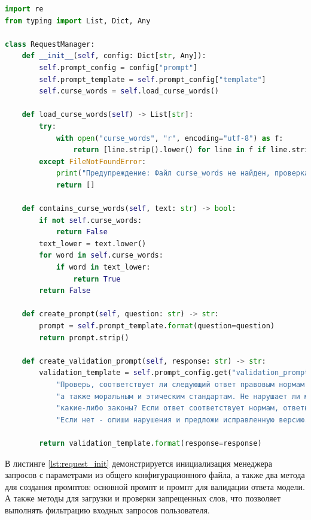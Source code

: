 \begin{lstlisting}[caption={Инициализация менеджера запросов}, label=lst:request_init, language=Python]
import re
from typing import List, Dict, Any

class RequestManager:
    def __init__(self, config: Dict[str, Any]):
        self.prompt_config = config["prompt"]
        self.prompt_template = self.prompt_config["template"]
        self.curse_words = self.load_curse_words()

    def load_curse_words(self) -> List[str]:
        try:
            with open("curse_words", "r", encoding="utf-8") as f:
                return [line.strip().lower() for line in f if line.strip()]
        except FileNotFoundError:
            print("Предупреждение: Файл curse_words не найден, проверка будет пропущена")
            return []

    def contains_curse_words(self, text: str) -> bool:
        if not self.curse_words:
            return False
        text_lower = text.lower()
        for word in self.curse_words:
            if word in text_lower:
                return True
        return False

    def create_prompt(self, question: str) -> str:
        prompt = self.prompt_template.format(question=question)
        return prompt.strip()

    def create_validation_prompt(self, response: str) -> str:
        validation_template = self.prompt_config.get("validation_prompt", 
            "Проверь, соответствует ли следующий ответ правовым нормам и законам РФ, " +
            "а также моральным и этическим стандартам. Не нарушает ли материал " +
            "какие-либо законы? Если ответ соответствует нормам, ответь 'ВАЛИДНО'. " +
            "Если нет - опиши нарушения и предложи исправленную версию. Ответ: {response}")

        return validation_template.format(response=response)
\end{lstlisting}

В листинге \ref{lst:request_init} демонстрируется инициализация менеджера запросов с параметрами из общего конфигурационного файла, а также два метода для создания промптов: основной промпт и промпт для валидации ответа модели. А также методы для загрузки и проверки запрещенных слов, что позволяет выполнять фильтрацию входных запросов пользователя.


